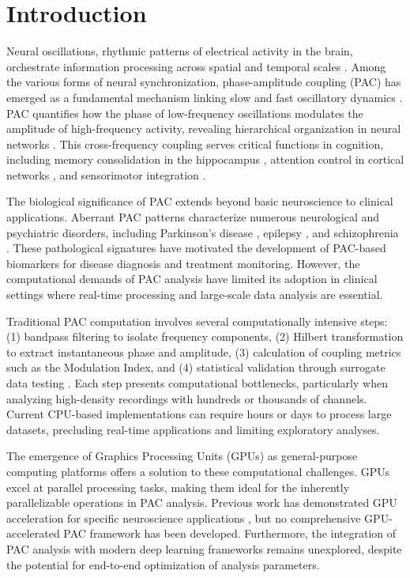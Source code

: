 
\section{Introduction}
\label{sec:introduction}

Neural oscillations, rhythmic patterns of electrical activity in the brain, orchestrate information processing across spatial and temporal scales \citep{Buzsaki2004}. Among the various forms of neural synchronization, phase-amplitude coupling (PAC) has emerged as a fundamental mechanism linking slow and fast oscillatory dynamics \citep{Canolty2010}. PAC quantifies how the phase of low-frequency oscillations modulates the amplitude of high-frequency activity, revealing hierarchical organization in neural networks \citep{Jensen2007}. This cross-frequency coupling serves critical functions in cognition, including memory consolidation in the hippocampus \citep{Tort2008}, attention control in cortical networks \citep{Szczepanski2014}, and sensorimotor integration \citep{deHemptinne2013}.

The biological significance of PAC extends beyond basic neuroscience to clinical applications. Aberrant PAC patterns characterize numerous neurological and psychiatric disorders, including Parkinson's disease \citep{deHemptinne2015}, epilepsy \citep{Amiri2016}, and schizophrenia \citep{Kirihara2012}. These pathological signatures have motivated the development of PAC-based biomarkers for disease diagnosis and treatment monitoring. However, the computational demands of PAC analysis have limited its adoption in clinical settings where real-time processing and large-scale data analysis are essential.

Traditional PAC computation involves several computationally intensive steps: (1) bandpass filtering to isolate frequency components, (2) Hilbert transformation to extract instantaneous phase and amplitude, (3) calculation of coupling metrics such as the Modulation Index, and (4) statistical validation through surrogate data testing \citep{Tort2010}. Each step presents computational bottlenecks, particularly when analyzing high-density recordings with hundreds or thousands of channels. Current CPU-based implementations can require hours or days to process large datasets, precluding real-time applications and limiting exploratory analyses.

The emergence of Graphics Processing Units (GPUs) as general-purpose computing platforms offers a solution to these computational challenges. GPUs excel at parallel processing tasks, making them ideal for the inherently parallelizable operations in PAC analysis. Previous work has demonstrated GPU acceleration for specific neuroscience applications \citep{Pachitariu2016}, but no comprehensive GPU-accelerated PAC framework has been developed. Furthermore, the integration of PAC analysis with modern deep learning frameworks remains unexplored, despite the potential for end-to-end optimization of analysis parameters.


